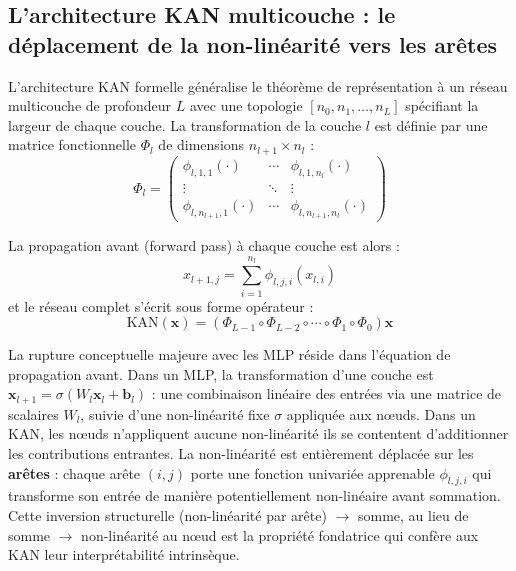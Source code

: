 \documentclass[11pt,a4paper,oneside]{report}
\theoremstyle{definition}
\theoremstyle{remark}
\begin{document}
\subsection{L'architecture KAN multicouche : le déplacement de la non-linéarité vers les arêtes}

L'architecture KAN formelle généralise le théorème de représentation à un réseau multicouche de profondeur $L$ avec une topologie $[n_0, n_1, \ldots, n_L]$ spécifiant la largeur de chaque couche. La transformation de la couche $l$ est définie par une matrice fonctionnelle $\Phi_l$ de dimensions $n_{l+1} \times n_l$ :
\begin{equation}
\Phi_l = \begin{pmatrix} \phi_{l,1,1}(\cdot) & \cdots & \phi_{l,1,n_l}(\cdot) \\ \vdots & \ddots & \vdots \\ \phi_{l,n_{l+1},1}(\cdot) & \cdots & \phi_{l,n_{l+1},n_l}(\cdot) \end{pmatrix}
\end{equation}

La propagation avant (forward pass) à chaque couche est alors :
\begin{equation}
x_{l+1,j} = \sum_{i=1}^{n_l} \phi_{l,j,i}(x_{l,i})
\end{equation}
et le réseau complet s'écrit sous forme opérateur :
\begin{equation}
\text{KAN}(\mathbf{x}) = \left(\Phi_{L-1} \circ \Phi_{L-2} \circ \cdots \circ \Phi_1 \circ \Phi_0\right) \mathbf{x}
\end{equation}

La rupture conceptuelle majeure avec les MLP réside dans l'équation de propagation avant. Dans un MLP, la transformation d'une couche est $\mathbf{x}_{l+1} = \sigma(W_l \mathbf{x}_l + \mathbf{b}_l)$ : une combinaison linéaire des entrées via une matrice de scalaires $W_l$, suivie d'une non-linéarité fixe $\sigma$ appliquée aux nœuds. Dans un KAN, les nœuds n'appliquent aucune non-linéarité  ils se contentent d'additionner les contributions entrantes. La non-linéarité est entièrement déplacée sur les \textbf{arêtes} : chaque arête $(i,j)$ porte une fonction univariée apprenable $\phi_{l,j,i}$ qui transforme son entrée de manière potentiellement non-linéaire avant sommation. Cette inversion structurelle  (non-linéarité par arête) $\rightarrow$ somme, au lieu de somme $\rightarrow$ non-linéarité au nœud  est la propriété fondatrice qui confère aux KAN leur interprétabilité intrinsèque.
\end{document}
